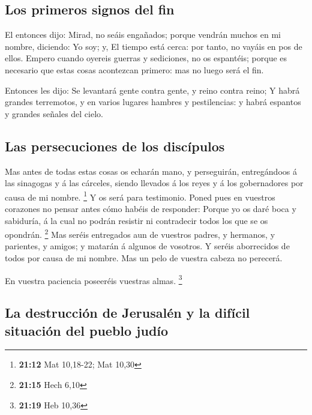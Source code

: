 \hypertarget{los-primeros-signos-del-fin}{%
\subsection{Los primeros signos del
fin}\label{los-primeros-signos-del-fin}}

 El entonces dijo: Mirad, no seáis engañados; porque vendrán
muchos en mi nombre, diciendo: Yo soy; y, El tiempo está cerca: por
tanto, no vayáis en pos de ellos.  Empero cuando oyereis
guerras y sediciones, no os espantéis; porque es necesario que estas
cosas acontezcan primero: mas no luego será el fin.

 Entonces les dijo: Se levantará gente contra gente, y
reino contra reino;  Y habrá grandes terremotos, y en
varios lugares hambres y pestilencias: y habrá espantos y grandes
señales del cielo.

\hypertarget{las-persecuciones-de-los-discuxedpulos}{%
\subsection{Las persecuciones de los
discípulos}\label{las-persecuciones-de-los-discuxedpulos}}

 Mas antes de todas estas cosas os echarán mano, y
perseguirán, entregándoos á las sinagogas y á las cárceles, siendo
llevados á los reyes y á los gobernadores por causa de mi nombre.
\footnote{\textbf{21:12} Mat 10,18-22; Mat 10,30}  Y os
será para testimonio.  Poned pues en vuestros corazones no
pensar antes cómo habéis de responder:  Porque yo os daré
boca y sabiduría, á la cual no podrán resistir ni contradecir todos los
que se os opondrán. \footnote{\textbf{21:15} Hech 6,10} 
Mas seréis entregados aun de vuestros padres, y hermanos, y parientes, y
amigos; y matarán á algunos de vosotros.  Y seréis
aborrecidos de todos por causa de mi nombre.  Mas un pelo
de vuestra cabeza no perecerá.

 En vuestra paciencia poseeréis vuestras almas. \footnote{\textbf{21:19}
  Heb 10,36}

\hypertarget{la-destrucciuxf3n-de-jerusaluxe9n-y-la-difuxedcil-situaciuxf3n-del-pueblo-juduxedo}{%
\subsection{La destrucción de Jerusalén y la difícil situación del
pueblo
judío}\label{la-destrucciuxf3n-de-jerusaluxe9n-y-la-difuxedcil-situaciuxf3n-del-pueblo-juduxedo}}

